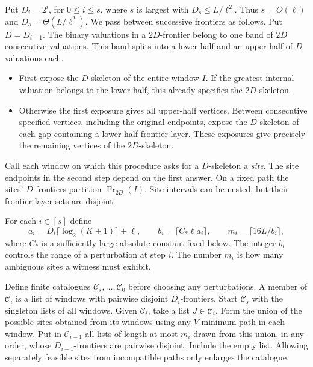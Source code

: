 \documentclass[11pt]{article}
\newcommand{\calC}{\mathcal C}
\newcommand{\fr}{\operatorname{Fr}}
\begin{document}
Put $D_i=2^i$, for $0\le i\le s$, where $s$ is largest with
$D_s\le L/\ell^2$. Thus $s=O(\ell)$ and $D_s=\Theta(L/\ell^2)$.
We pass between successive frontiers as follows. Put $D=D_{i-1}$.
The binary valuations in a $2D$-frontier belong to one
band of $2D$ consecutive valuations. This band splits into a lower
half and an upper half of $D$ valuations each.
\begin{itemize}
\item First expose the $D$-skeleton of the entire window $I$.
If the greatest internal valuation belongs to the lower half, this
already specifies the $2D$-skeleton.
\item Otherwise the first exposure gives all upper-half vertices.
Between consecutive specified vertices, including the original endpoints,
expose the $D$-skeleton of each gap containing a lower-half frontier
layer. These exposures give precisely the remaining vertices of the
$2D$-skeleton.
\end{itemize}
Call each window on which this procedure asks for a $D$-skeleton a
\emph{site}. The site endpoints in the second step depend on the first
answer. On a fixed path the sites' $D$-frontiers partition $\fr_{2D}(I)$.
Site intervals can be nested, but their frontier layer sets are disjoint.

For each $i\in[s]$ define
\[
 a_i=D_i\lceil\log_2(K+1)\rceil+\ell,\qquad
 b_i=\lceil C_*\ell a_i\rceil,\qquad m_i=\lceil 16 L/b_i\rceil ,
\]
where $C_*$ is a sufficiently large absolute constant fixed below.
The integer $b_i$ controls the range of a perturbation at step $i$.
The number $m_i$ is how many ambiguous sites a witness must exhibit.

Define finite catalogues $\calC_s,\ldots,\calC_0$ before choosing any
perturbations. A member of $\calC_i$ is a list of windows with pairwise
disjoint $D_i$-frontiers. Start $\calC_s$ with the singleton lists of all
windows. Given $\calC_i$, take a list $J\in\calC_i$. Form the union of
the possible sites obtained from its windows using any $V$-minimum path
in each window. Put in $\calC_{i-1}$ all lists of length at most $m_i$
drawn from this union, in any order, whose $D_{i-1}$-frontiers are
pairwise disjoint. Include the empty list. Allowing separately feasible
sites from incompatible paths only enlarges the catalogue.
\end{document}
